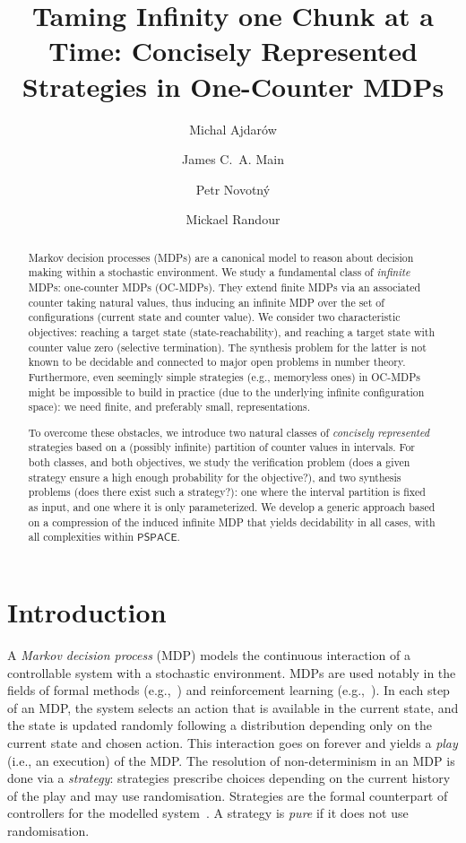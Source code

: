 \documentclass[a4paper,UKenglish,cleveref,autoref,thm-restate,colorlinks]{lipics-v2021}
\title{Taming Infinity one Chunk at a Time: Concisely Represented Strategies in One-Counter MDPs}
\author{Michal Ajdar\'{o}w}{Masaryk University, Czech Republic}{}{}{}
\author{{James C.~A.} Main}{F.R.S.-FNRS and UMONS -- Université de Mons, Belgium}{}{}{Research Fellow of the Fonds de la Recherche Scientifique -- FNRS and member of the TRAIL institute.}
\author{Petr Novotn\'{y}}{Masaryk University, Czech Republic}{}{}{}
\author{Mickael Randour}{F.R.S.-FNRS and UMONS -- Université de Mons, Belgium}{}{}{Research Associate of the Fonds de la Recherche Scientifique -- FNRS and member of the TRAIL institute.}
\newcommand{\pspace}{\textsf{PSPACE}}
\begin{document}
\maketitle

\begin{abstract}
  Markov decision processes (MDPs) are a canonical model to reason about decision making within a stochastic environment. We study a fundamental class of \textit{infinite} MDPs: one-counter MDPs (OC-MDPs). They extend finite MDPs via an associated counter taking natural values, thus inducing an infinite MDP over the set of configurations (current state and counter value). We consider two characteristic objectives: reaching a target state (state-reachability), and reaching a target state with counter value zero (selective termination). The synthesis problem for the latter is not known to be decidable and connected to major open problems in number theory. Furthermore, even seemingly simple strategies (e.g., memoryless ones) in OC-MDPs might be impossible to build in practice (due to the underlying infinite configuration space): we need finite, and preferably small, representations.

To overcome these obstacles, we introduce two natural classes of \textit{concisely represented} strategies based on a (possibly infinite) partition of counter values in intervals. For both classes, and both objectives, we study the verification problem (does a given strategy ensure a high enough probability for the objective?), and two synthesis problems (does there exist such a strategy?): one where the interval partition is fixed as input, and one where it is only parameterized. We develop a generic approach based on a compression of the induced infinite MDP that yields decidability in all cases, with all complexities within $\pspace$.
\end{abstract}


\section{Introduction}\label{section:introduction}
A \textit{Markov decision process} (MDP) models the continuous interaction of a controllable system with a stochastic environment.
MDPs are used notably in the fields of formal methods (e.g.,~\cite{BK08,gog23}) and reinforcement learning (e.g.,~\cite{SuttonB18}).
In each step of an MDP, the system selects an action that is available in the current state, and the state is updated randomly following a distribution depending only on the current state and chosen action.
This interaction goes on forever and yields a \textit{play} (i.e., an execution) of the MDP.
The resolution of non-determinism in an MDP is done via a \textit{strategy}: strategies prescribe choices depending on the current history of the play and may use randomisation.
Strategies are the formal counterpart of controllers for the modelled system~\cite{rECCS,DBLP:reference/mc/BloemCJ18}.
A strategy is \textit{pure} if it does not use randomisation.
\end{document}
